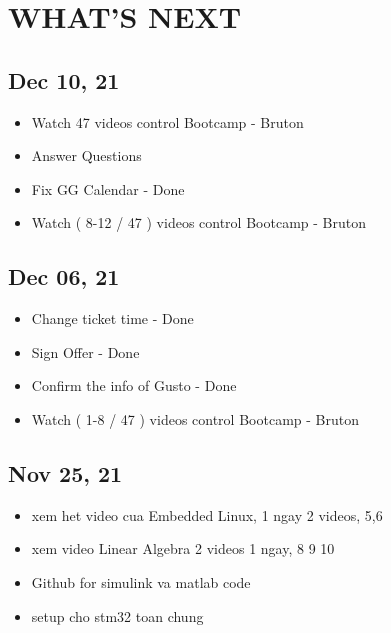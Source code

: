 \section{WHAT'S NEXT}

\subsection{Dec 10, 21}
\begin{itemize}
    \item Watch 47 videos control Bootcamp - Bruton
    \item Answer Questions
    \item Fix GG Calendar - Done
    \item Watch ( 8-12 / 47 ) videos control Bootcamp - Bruton
\end{itemize}

\subsection{Dec 06, 21}
\begin{itemize}
    \item Change ticket time - Done
    \item Sign Offer - Done
    \item Confirm the info of Gusto - Done
    \item Watch ( 1-8 / 47 ) videos control Bootcamp - Bruton
\end{itemize}

\subsection{Nov 25, 21}
\begin{itemize}
    \item xem het video cua Embedded Linux, 1 ngay 2 videos, 5,6 
    \item xem video Linear Algebra 2 videos 1 ngay, 8 9 10
    \item Github for simulink va matlab code
    \item setup cho stm32 toan chung
\end{itemize}
